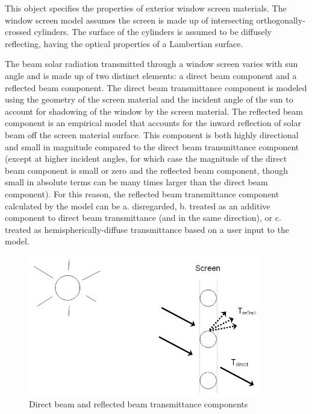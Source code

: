 This object specifies the properties of exterior window screen materials. The window screen model assumes the screen is made up of intersecting orthogonally-crossed cylinders. The surface of the cylinders is assumed to be diffusely reflecting, having the optical properties of a Lambertian surface.

The beam solar radiation transmitted through a window screen varies with sun angle and is made up of two distinct elements: a direct beam component and a reflected beam component. The direct beam transmittance component is modeled using the geometry of the screen material and the incident angle of the sun to account for shadowing of the window by the screen material. The reflected beam component is an empirical model that accounts for the inward reflection of solar beam off the screen material surface. This component is both highly directional and small in magnitude compared to the direct beam transmittance component (except at higher incident angles, for which case the magnitude of the direct beam component is small or zero and the reflected beam component, though small in absolute terms can be many times larger than the direct beam component). For this reason, the reflected beam transmittance component calculated by the model can be a. disregarded, b. treated as an additive component to direct beam transmittance (and in the same direction), or c. treated as hemispherically-diffuse transmittance based on a user input to the model.

\begin{figure}[hbtp] %
\centering
\includegraphics[width=0.9\textwidth, height=0.9\textheight, keepaspectratio=true]{media/image043.png}
\caption{Direct beam and reflected beam transmittance components \protect \label{fig:direct-beam-and-reflected-beam-transmittance}}
\end{figure}

